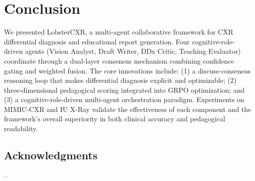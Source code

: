 \documentclass[runningheads,10pt]{llncs}
\begin{document}
\section{Conclusion}

We presented LobsterCXR, a multi-agent collaborative framework for CXR differential diagnosis and educational report generation. Four cognitive-role-driven agents (Vision Analyst, Draft Writer, DDx Critic, Teaching Evaluator) coordinate through a dual-layer consensus mechanism combining confidence gating and weighted fusion. The core innovations include: (1) a discuss-consensus reasoning loop that makes differential diagnosis explicit and optimizable; (2) three-dimensional pedagogical scoring integrated into GRPO optimization; and (3) a cognitive-role-driven multi-agent orchestration paradigm. Experiments on MIMIC-CXR and IU X-Ray validate the effectiveness of each component and the framework's overall superiority in both clinical accuracy and pedagogical readability.

\subsection*{Acknowledgments}
--
\end{document}
